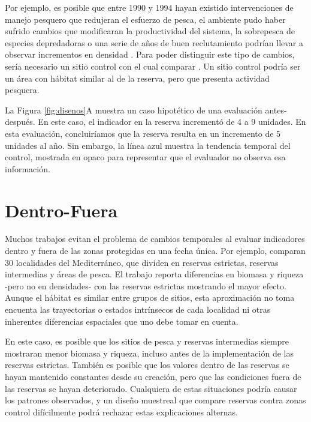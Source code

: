 \documentclass[]{krantz}
\begin{document}
Por ejemplo, es posible que entre 1990 y 1994 hayan existido
intervenciones de manejo pesquero que redujeran el esfuerzo de pesca, el
ambiente pudo haber sufrido cambios que modificaran la productividad del
sistema, la sobrepesca de especies depredadoras o una serie de años de
buen reclutamiento podrían llevar a observar incrementos en densidad
\citep{szuwalski_2017, chavez_2003}. Para poder distinguir este tipo de
cambios, sería necesario un sitio control con el cual comparar
\citep{betti_2017}. Un sitio control podría ser un área con hábitat
similar al de la reserva, pero que presenta actividad pesquera.

La Figura \ref{fig:disenos}A muestra un caso hipotético de una
evaluación antes-después. En este caso, el indicador en la reserva
incrementó de 4 a 9 unidades. En esta evaluación, concluiríamos que la
reserva resulta en un incremento de 5 unidades al año. Sin embargo, la
línea azul muestra la tendencia temporal del control, mostrada en opaco
para representar que el evaluador no observa esa información.

\hypertarget{dentro-fuera}{%
\section{Dentro-Fuera}\label{dentro-fuera}}

Muchos trabajos evitan el problema de cambios temporales al evaluar
indicadores dentro y fuera de las zonas protegidas en una fecha única.
Por ejemplo, \citet{guidetti_2014} comparan 30 localidades del
Mediterráneo, que dividen en reservas estrictas, reservas intermedias y
áreas de pesca. El trabajo reporta diferencias en biomasa y riqueza
-pero no en densidades- con las reservas estrictas mostrando el mayor
efecto. Aunque el hábitat es similar entre grupos de sitios, esta
aproximación no toma encuenta las trayectorias o estados intrínsecos de
cada localidad ni otras inherentes diferencias espaciales que uno debe
tomar en cuenta.

En este caso, es posible que los sitios de pesca y reservas intermedias
siempre mostraran menor biomasa y riqueza, incluso antes de la
implementación de las reservas estrictas. También es posible que los
valores dentro de las reservas se hayan mantenido constantes desde su
creación, pero que las condiciones fuera de las reservas se hayan
deteriorado. Cualquiera de estas situaciones podría causar los patrones
observados, y un diseño muestreal que compare reservas contra zonas
control difícilmente podrá rechazar estas explicaciones alternas.
\end{document}
